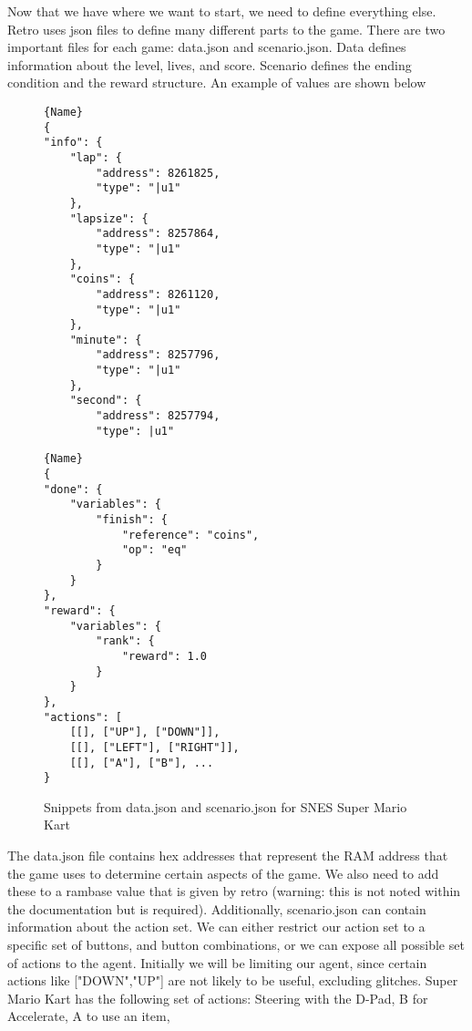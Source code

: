 Now that we have where we want to start, we need to define everything else.  
Retro uses json files to define many different parts to the game. There are 
two important files for each game: data.json and scenario.json. Data defines
information about the level, lives, and score. Scenario defines the
ending condition and the reward structure. An example of values are shown
below
\\
\begin{figure}[h!]
\begin{minipage}{0.47\textwidth}
    \begin{lstlisting}[caption=data.json, frame=tlrb]{Name}
{
"info": {
    "lap": {
        "address": 8261825,
        "type": "|u1"
    },
    "lapsize": {
        "address": 8257864,
        "type": "|u1"
    },
    "coins": {
        "address": 8261120,
        "type": "|u1"
    },
    "minute": {
        "address": 8257796,
        "type": "|u1"
    },
    "second": {
        "address": 8257794,
        "type": |u1"
    \end{lstlisting}
\end{minipage}\hfill
\begin{minipage}{0.47\textwidth}
    \begin{lstlisting}[caption=scenario.json, frame=tlrb]{Name}
{
"done": {
    "variables": {
        "finish": {
            "reference": "coins",
            "op": "eq"
        }
    }
},
"reward": {
    "variables": {
        "rank": {
            "reward": 1.0
        }
    }
},
"actions": [
    [[], ["UP"], ["DOWN"]],
    [[], ["LEFT"], ["RIGHT"]],
    [[], ["A"], ["B"], ...
}
    \end{lstlisting}
\end{minipage}
    \caption{Snippets from data.json and scenario.json for SNES Super Mario Kart}
\end{figure}
The data.json file contains hex addresses that represent the RAM address that the
game uses to determine certain aspects of the game. We also need to add these
to a rambase value that is given by retro (warning: this is not noted within
the documentation but is required).
Additionally, scenario.json can contain information about the action set. We can
either restrict our action set to a specific set of buttons, and button 
combinations, or we can expose all possible set of actions to the agent. Initially
we will be limiting our agent, since certain actions like ["DOWN","UP"] are
not likely to be useful, excluding glitches. Super Mario Kart has the following
set of actions: Steering with the D-Pad, B for Accelerate, A to use an item, 
